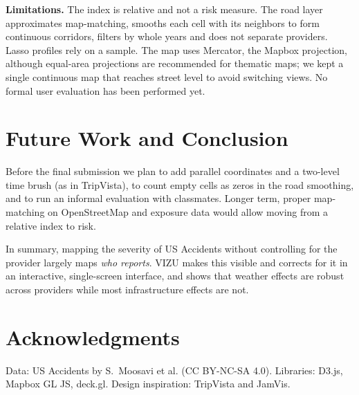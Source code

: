 \documentclass[conference]{IEEEtran}
\begin{document}
\textbf{Limitations.} The index is relative and not a risk measure. The road layer approximates map-matching, smooths each cell with its neighbors to form continuous corridors, filters by whole years and does not separate providers. Lasso profiles rely on a sample. The map uses Mercator, the Mapbox projection, although equal-area projections are recommended for thematic maps; we kept a single continuous map that reaches street level to avoid switching views. No formal user evaluation has been performed yet.

\section{Future Work and Conclusion}

Before the final submission we plan to add parallel coordinates and a two-level time brush (as in TripVista), to count empty cells as zeros in the road smoothing, and to run an informal evaluation with classmates. Longer term, proper map-matching on OpenStreetMap and exposure data would allow moving from a relative index to risk.

In summary, mapping the severity of US Accidents without controlling for the provider largely maps \emph{who reports}. VIZU makes this visible and corrects for it in an interactive, single-screen interface, and shows that weather effects are robust across providers while most infrastructure effects are not.

\section*{Acknowledgments}
Data: US Accidents by S.~Moosavi et al. (CC BY-NC-SA 4.0). Libraries: D3.js, Mapbox GL JS, deck.gl. Design inspiration: TripVista and JamVis.



\end{document}
